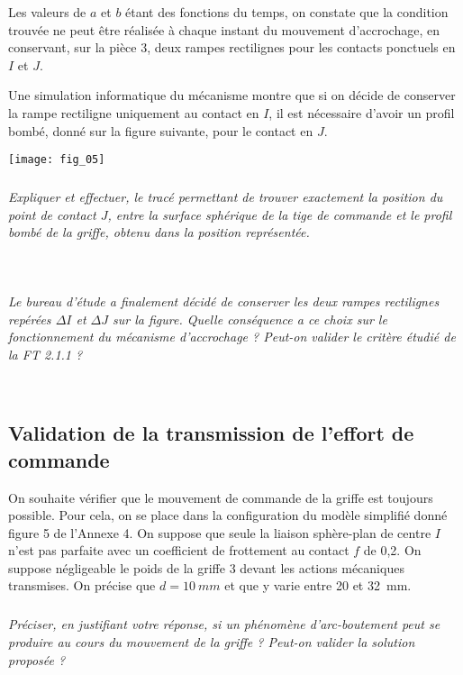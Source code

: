 \begin{multicols}{2}
Les valeurs de $a$ et $b$ étant des fonctions du temps, on constate que la condition trouvée ne peut être réalisée
à chaque instant du mouvement d'accrochage, en conservant, sur la pièce 3, deux rampes rectilignes pour les
contacts ponctuels en $I$ et $J$.

Une simulation informatique du mécanisme montre que si on décide de conserver la rampe rectiligne
uniquement au contact en $I$, il est nécessaire d'avoir un profil bombé, donné sur la figure suivante, pour
le contact en $J$.

\begin{center}
\texttt{[image: fig\_05]}
\end{center}

\subparagraph{}\textit{Expliquer et effectuer, le tracé permettant de trouver exactement la position du
point de contact $J$, entre la surface sphérique de la tige de commande et le profil bombé de la griffe, obtenu
dans la position représentée.}
\ifprof
\begin{corrige}~\\
\end{corrige}
\else
\fi



\subparagraph{}\textit{Le bureau d'étude a finalement décidé de conserver les deux rampes rectilignes repérées $\Delta I$ et $\Delta J$ sur la figure. Quelle conséquence a ce choix sur le fonctionnement du mécanisme d'accrochage ?
Peut-on valider le critère étudié de la FT 2.1.1 ?}
\ifprof
\begin{corrige}~\\
\end{corrige}
\else
\fi


\subsection*{Validation de la transmission de l'effort de commande}


On souhaite vérifier que le mouvement de commande de la griffe est toujours possible. Pour cela, on se
place dans la configuration du modèle simplifié donné figure 5 de l'Annexe 4. On suppose que seule la liaison
sphère-plan de centre $I$ n'est pas parfaite avec un coefficient de frottement au contact $f$ de 0,2. On suppose
négligeable le poids de la griffe 3 devant les actions mécaniques transmises. On précise que $d=\SI{10}{mm}$ et que
y varie entre 20 et \SI{32}{mm}.

\subparagraph{}\textit{Préciser, en justifiant votre réponse, si un phénomène d'arc-boutement peut se produire au cours du mouvement
de la griffe ? Peut-on valider la solution proposée ?}
\ifprof
\begin{corrige}~\\
\end{corrige}
\else
\fi







\end{multicols}
